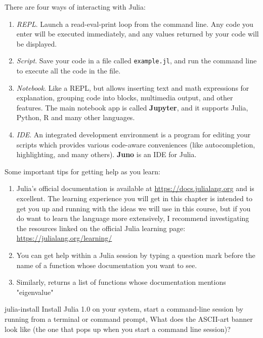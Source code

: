 \documentclass[prettycode,jlmin,shellescape]{watsonbook}
\begin{document}
There are four ways of interacting with Julia: 
  \begin{enumerate}
  \item \textit{REPL}. Launch a read-eval-print loop from the
    command line. Any code you enter will be executed immediately,
    and any values returned by your code will be displayed. 
  \item \textit{Script}. Save your code in a file called
    \texttt{example.jl}, and run  the
    command line to execute all the code in the file.
  \item \textit{Notebook}. Like a REPL, but allows inserting text and
    math expressions for explanation, grouping code into blocks,
    multimedia output, and other features. The main notebook app is
    called \textbf{Jupyter}, and it supports Julia, Python, R and many
    other languages.
  \item \textit{IDE}. An integrated development environment is a
    program for editing your scripts which provides various
    code-aware conveniences (like autocompletion, highlighting, and
    many others). \textbf{Juno} is an IDE for Julia. 
  \end{enumerate}

  Some important tips for getting help as you learn:

  \begin{enumerate}
  \item Julia's official documentation is available at
    \url{https://docs.julialang.org} and is excellent. The learning
    experience you will get in this chapter is intended to get you up
    and running with the ideas we will use in this course, but if you
    do want to learn the language more extensively, I recommend
    investigating the resources linked on the official Julia learning
    page: \url{https://julialang.org/learning/}
  \item You can get help within a Julia session by typing a question
    mark before the name of a function whose documentation you want to
    see. 
  \item Similarly,  returns a list
    of functions whose documentation mentions "eigenvalue"
  \end{enumerate}

  \begin{exercise}{}{julia-install}
   Install Julia 1.0 on your system, start a command-line session
    by running  from a terminal or command prompt,
    What does the ASCII-art banner look like (the one that pops up
    when you start a command line session)? 
  \end{exercise}
\end{document}
